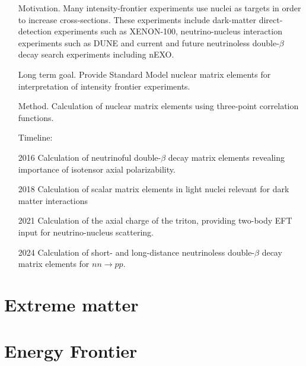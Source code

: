 \documentclass{article}
\begin{document}
\begin{itemize}  
    \item[Motivation.] Many intensity-frontier experiments use nuclei as targets in order to increase cross-sections. These experiments include dark-matter direct-detection experiments such as XENON-100, neutrino-nucleus interaction experiments such as DUNE and current and future neutrinoless double-$\beta$ decay search experiments including nEXO.
    
    \item[Long term goal.]  Provide Standard Model nuclear matrix elements for interpretation of intensity frontier experiments.
    
    \item[Method.] 
    Calculation of nuclear matrix elements using three-point correlation functions.
    
\item[Timeline:]
\item[2016] Calculation of neutrinoful double-$\beta$ decay matrix elements revealing importance of isotensor axial polarizability.
    \item[2018] Calculation of scalar matrix elements in light nuclei relevant for dark matter interactions 
    \item[2021] Calculation of the axial charge of the triton, providing two-body EFT input for neutrino-nucleus scattering.
    \item[2024] Calculation of short- and long-distance neutrinoless double-$\beta$ decay matrix elements for $nn\to pp$.
\end{itemize}


\section{Extreme matter}\label{sec:extreme}


\section{Energy Frontier}\label{sec:energy}






\end{document}
